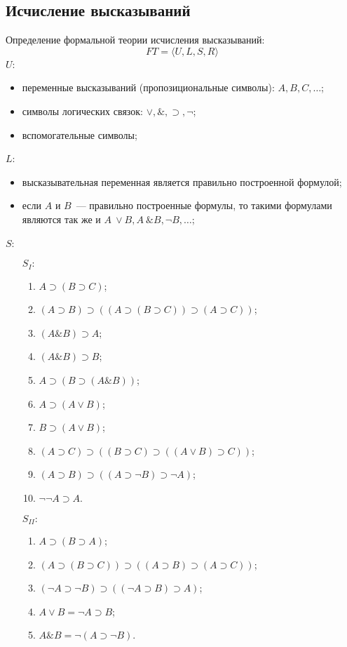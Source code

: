 \documentclass[a4paper,12pt]{report}
\begin{document}
\subsection{Исчисление высказываний}
	Определение формальной теории исчисления высказываний:
	$$ FT = \langle U, L, S, R \rangle $$
	$ U $:
	\begin{itemize}
		\item переменные высказываний (пропозициональные символы):
			$ A, B, C, \dots $;
		\item символы логических связок: $ \vee, \&, \supset, \neg $;
		\item вспомогательные символы;
	\end{itemize}
	$ L $:
	\begin{itemize}
		\item высказывательная переменная является правильно построенной
			формулой;
		\item если $ A $ и $ B $~--- правильно построенные формулы, то такими
			формулами являются так же и $ A~\vee B, A~\& B, \neg B, \dots $;
	\end{itemize}
	$ S $:
	\begin{itemize}
		\item[$ S_{I}: $]
			\begin{enumerate}
				\item $ A \supset (B \supset C) $;
				\item $ (A \supset B) \supset ((A \supset (B \supset C)) \supset (A
					\supset C)) $;
				\item $ (A \& B) \supset A $;
				\item $ (A \& B) \supset B $;
				\item $ A \supset (B \supset (A \& B)) $;
				\item $ A \supset (A \vee B) $;
				\item $ B \supset (A \vee B) $;
				\item $ (A \supset C) \supset ((B \supset C) \supset ((A \vee B)
					\supset C)) $;
				\item $ (A \supset B) \supset ((A \supset \neg B) \supset \neg A) $;
				\item $ \neg \neg A \supset A $.
			\end{enumerate}
		\item[$ S_{II}:  $]
			\begin{enumerate}
				\item $ A \supset (B \supset A) $;
				\item $ (A \supset (B \supset C)) \supset ((A \supset B) \supset (A
					\supset C)) $;
				\item $ (\neg A \supset \neg B) \supset ((\neg A \supset B) \supset A)
					$;
				\item $ A \vee B = \neg A \supset B $;
				\item $ A \& B = \neg(A \supset \neg B) $.
			\end{enumerate}
	\end{itemize}
\end{document}
